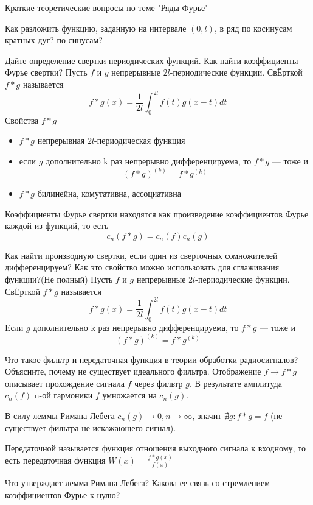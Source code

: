 \documentclass{article}
\begin{document}
\begin{section}{Краткие теоретические вопросы по теме "Ряды Фурье"}
\begin{subsection}{Как разложить функцию, заданную на интервале $(0, l)$, в ряд по косинусам кратных дуг? по синусам?}
\end{subsection}


\begin{subsection}{Дайте определение свертки периодических функций. Как найти коэффициенты Фурье свертки?}
Пусть $f$ и $g$ непрерывные $2l$-периодические функции. СвЁрткой $f*g$ называется 
\[f*g(x) = \frac{1}{2l}\int_0^{2l}f(t)g(x-t)dt\]
Свойства $f*g$
\begin{itemize}
	\item
	$f*g$ непрерывная $2l$-периодическая функция
	\item
	если $g$ дополнительно k раз непрерывно дифференцируема, то $f*g$ --- тоже и 
	\[(f*g)^{(k)} = f*g^{(k)}\]
	\item
	$f*g$ билинейна, комутативна, ассоциативна
\end{itemize}

Коэффициенты Фурье свертки находятся как произведение коэффициентов Фурье каждой из функций, то есть
\[c_n(f*g)=c_n(f)c_n(g)\]
\end{subsection}


\begin{subsection}{Как найти производную свертки, если один из сверточных сомножителей дифференцируем? Как это свойство можно использовать для сглаживания функции?(Не полный)}
Пусть $f$ и $g$ непрерывные $2l$-периодические функции. СвЁрткой $f*g$ называется 
\[f*g(x) = \frac{1}{2l}\int_0^{2l}f(t)g(x-t)dt\]
Eсли $g$ дополнительно k раз непрерывно дифференцируема, то $f*g$ --- тоже и 
\[(f*g)^{(k)} = f*g^{(k)}\]
\end{subsection}


\begin{subsection}{Что такое фильтр и передаточная функция в теории обработки радиосигналов? Объясните, почему не существует идеального фильтра.}
Отображение $f \rightarrow f*g$ описывает прохождение сигнала $f$ через фильтр $g$. 
В результате амплитуда $c_n(f)$ n-ой гармоники $f$ умножается на $c_n(g)$.

В силу леммы Римана-Лебега $c_n(g)\rightarrow 0, n\rightarrow \infty$, значит $\nexists g: f*g=f$ (не существует фильтра не искажающего сигнал).

Передаточной называется функция отношения выходного сигнала к входному, то есть передаточная функция $ W(x) = \frac{f*g(x)}{f(x)} $ 
\end{subsection}


\begin{subsection}{Что утверждает лемма Римана-Лебега? Какова ее связь со стремлением коэффициентов Фурье к нулю?}


\end{subsection}
\end{section}
\end{document}
